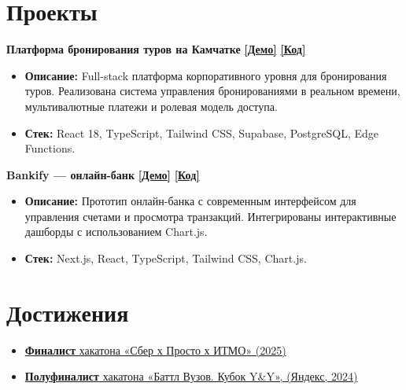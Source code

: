 \documentclass[a4paper,10pt]{article}
\begin{document}
\section*{Проекты}
\noindent\textbf{Платформа бронирования туров на Камчатке} \hfill \href{https://kamchatka-adventures.netlify.app/}{\textbf{[Демо]}} \quad \href{https://github.com/Jimike110/Kamchatka/}{\textbf{[Код]}} \\
\begin{itemize}[leftmargin=*, topsep=0.5ex, itemsep=0.2ex]
    \item \textbf{Описание:} Full-stack платформа корпоративного уровня для бронирования туров. Реализована система управления бронированиями в реальном времени, мультивалютные платежи и ролевая модель доступа.
    \item \textbf{Стек:} React 18, TypeScript, Tailwind CSS, Supabase, PostgreSQL, Edge Functions.
\end{itemize}
\vspace{1ex}

\noindent\textbf{Bankify — онлайн-банк} \hfill \href{https://bankify-jimike.vercel.app/}{\textbf{[Демо]}} \quad \href{https://github.com/Jimike110/bankify}{\textbf{[Код]}} \\
\begin{itemize}[leftmargin=*, topsep=0.5ex, itemsep=0.2ex]
    \item \textbf{Описание:} Прототип онлайн-банка с современным интерфейсом для управления счетами и просмотра транзакций. Интегрированы интерактивные дашборды с использованием Chart.js.
    \item \textbf{Стек:} Next.js, React, TypeScript, Tailwind CSS, Chart.js.
\end{itemize}


\section*{Достижения}
\begin{itemize}[leftmargin=*, topsep=0.5ex, itemsep=0.2ex]
    \item \href{https://disk.yandex.ru/i/wE10Gv0LYPanjg}{\textbf{Финалист} хакатона «Сбер х Просто х ИТМО» (2025)}
    \item \href{https://certify.s3.yandex.net/young-yandex/74b6021d-3100-422c-b4d4-0a0d8d1833ea/4df33b64-d63d-402a-92cb-dd5955e80ff3.pdf}{\textbf{Полуфиналист} хакатона «Баттл Вузов. Кубок Y\&Y», (Яндекс, 2024)}
\end{itemize}
\end{document}
